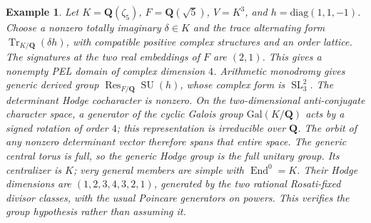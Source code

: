 \documentclass[10pt,reqno]{article}
\theoremstyle{emphasizedplain}
\theoremstyle{emphasizeddefinition}
\newtheorem{example}[theorem]{Example}
\theoremstyle{emphasizeddefinition}
\DeclareMathOperator{\End}{End}
\DeclareMathOperator{\SL}{SL}
\DeclareMathOperator{\SU}{SU}
\DeclareMathOperator{\Res}{Res}
\DeclareMathOperator{\Tr}{Tr}
\newcommand{\Q}{\mathbf Q}
\begin{document}
\begin{example}
Let $K=\Q(\zeta_5)$, $F=\Q(\sqrt5)$, $V=K^3$, and
$h=\mathrm{diag}(1,1,-1)$. Choose a nonzero totally imaginary
$\delta\in K$ and the trace alternating form $\Tr_{K/\Q}(\delta h)$,
with compatible positive complex structures and an order lattice.
The signatures at the two real embeddings of $F$ are $(2,1)$.
This gives a nonempty PEL domain of complex dimension $4$.
Arithmetic monodromy gives generic derived group
$\Res_{F/\Q}\SU(h)$, whose complex form is $\SL_3^2$.
The determinant Hodge cocharacter is nonzero. On the two-dimensional
anti-conjugate character space, a generator of the cyclic Galois group
$\mathrm{Gal}(K/\Q)$ acts by a signed rotation of order $4$; this
representation is irreducible over $\Q$. The orbit of any nonzero
determinant vector therefore spans that entire space. The generic
central torus is full, so the generic Hodge group is the full unitary group.
Its centralizer is $K$; very general members are simple with $\End^0=K$.
Their Hodge dimensions are $(1,2,3,4,3,2,1)$, generated by the two
rational Rosati-fixed divisor classes, with the usual Poincare generators
on powers. This verifies the group hypothesis rather than assuming it.
\end{example}
\end{document}
